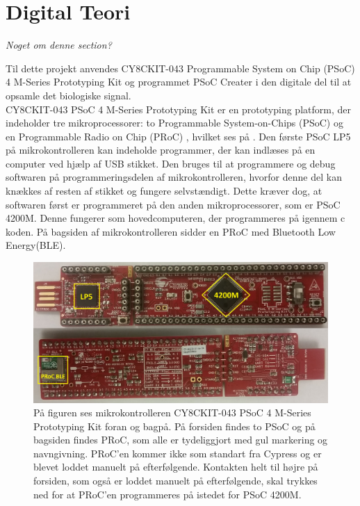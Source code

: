 \section{Digital Teori}
\textit{Noget om denne section?}

Til dette projekt anvendes CY8CKIT-043 Programmable System on Chip (PSoC) 4 M-Series Prototyping Kit og programmet PSoC Creater i den digitale del til at opsamle det biologiske signal.\\
CY8CKIT-043 PSoC 4 M-Series Prototyping Kit er en prototyping platform, der indeholder tre mikroprocessorer: to Programmable System-on-Chips (PSoC) og en Programmable Radio on Chip (PRoC)%
, hvilket ses på . Den første PSoC LP5 på mikrokontrolleren kan indeholde programmer, der kan indlæses på en computer ved hjælp af USB stikket. Den bruges til at programmere og debug softwaren på programmeringsdelen af mikrokontrolleren, hvorfor denne del kan knækkes af resten af stikket og fungere selvstændigt. Dette kræver dog, at softwaren først er programmeret på den anden mikroprocessorer, som er PSoC 4200M. Denne fungerer som hovedcomputeren, der programmeres på igennem c koden. På bagsiden af mikrokontrolleren sidder en PRoC med Bluetooth Low Energy(BLE). \citep{CYPRESS2016PSoC,Semiconductor2016}
\begin{figure}[H]
	\centering
	\includegraphics[scale=0.15]{figures/bProblemloesning/PSoC3.jpg}
	\caption{På figuren ses mikrokontrolleren CY8CKIT-043 PSoC 4 M-Series Prototyping Kit foran og bagpå. På forsiden findes to PSoC og på bagsiden findes PRoC, som alle er tydeliggjort med gul markering og navngivning. PRoC'en kommer ikke som standart fra Cypress og er blevet loddet manuelt på efterfølgende. Kontakten helt til højre på forsiden, som også er loddet manuelt på efterfølgende, skal trykkes ned for at PRoC'en programmeres på istedet for PSoC 4200M.}
	\label{fig:PSoC}
\end{figure}

